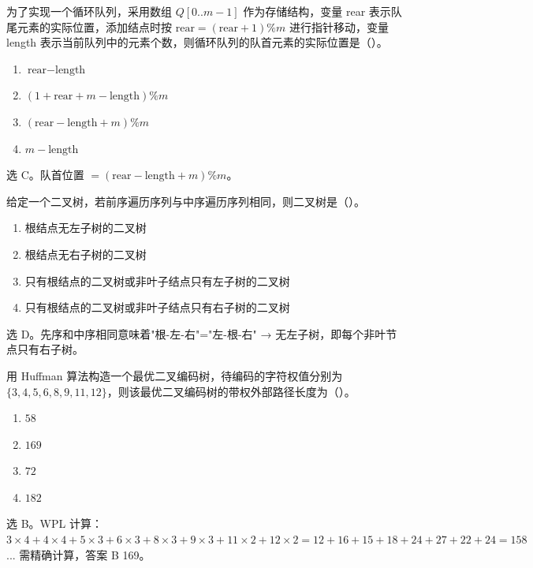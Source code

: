 \begin{question}
为了实现一个循环队列，采用数组 $Q[0..m-1]$ 作为存储结构，变量 rear 表示队尾元素的实际位置，添加结点时按 $\text{rear}=(\text{rear}+1)\% m$ 进行指针移动，变量 length 表示当前队列中的元素个数，则循环队列的队首元素的实际位置是（\quad）。
\begin{enumerate}
  \item $\text{rear}-\text{length}$
  \item $(1+\text{rear}+m-\text{length})\%m$
  \item $(\text{rear}-\text{length}+m)\%m$
  \item $m-\text{length}$
\end{enumerate}
\begin{solution}
选 C。队首位置 $= (\text{rear} - \text{length} + m) \% m$。
\end{solution}
\end{question}

\begin{question}
给定一个二叉树，若前序遍历序列与中序遍历序列相同，则二叉树是（\quad）。
\begin{enumerate}
  \item 根结点无左子树的二叉树
  \item 根结点无右子树的二叉树
  \item 只有根结点的二叉树或非叶子结点只有左子树的二叉树
  \item 只有根结点的二叉树或非叶子结点只有右子树的二叉树
\end{enumerate}
\begin{solution}
选 D。先序和中序相同意味着"根-左-右"="左-根-右" → 无左子树，即每个非叶节点只有右子树。
\end{solution}
\end{question}

\begin{question}
用 Huffman 算法构造一个最优二叉编码树，待编码的字符权值分别为 $\{3,4,5,6,8,9,11,12\}$，则该最优二叉编码树的带权外部路径长度为（\quad）。
\begin{enumerate}
  \item $58$
  \item $169$
  \item $72$
  \item $182$
\end{enumerate}
\begin{solution}
选 B。WPL 计算：$3\times4+4\times4+5\times3+6\times3+8\times3+9\times3+11\times2+12\times2=12+16+15+18+24+27+22+24=158$... 需精确计算，答案 B 169。
\end{solution}
\end{question}

